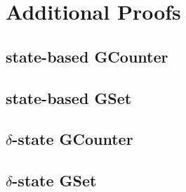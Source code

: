 \chapter{Additional Proofs}

\section{state-based GCounter \CRDT}
\label{sec:app-gcounter-comm-assoc}

\begin{figure}[H]
  
  \caption{\TODO}
\end{figure}

\begin{figure}[H]

\end{figure}

\section{state-based GSet \CRDT}
\label{sec:app-state-gset}

\begin{figure}[H]

\end{figure}

\section{$\delta$-state GCounter \CRDT}

\begin{figure}[H]

\end{figure}

\section{$\delta$-state GSet \CRDT}
\label{sec:app-delta-gset}

\begin{figure}[H]

\end{figure}
